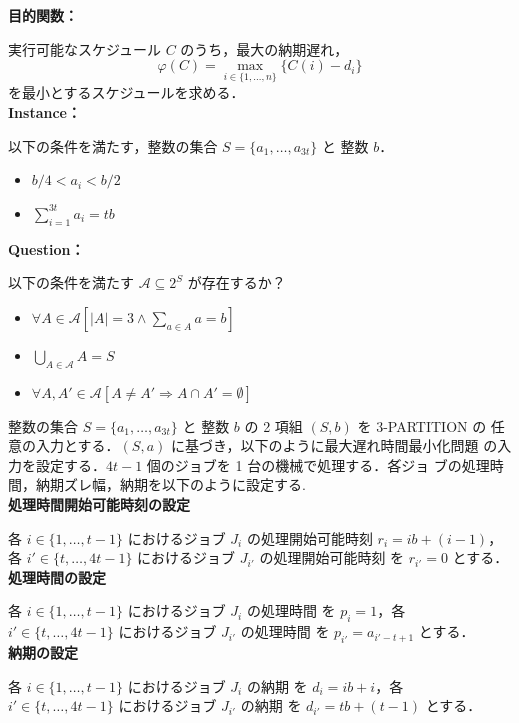 \documentclass[12pt]{optlab-bachelor}
\begin{document}
\noindent \textbf{目的関数：}

実行可能なスケジュール $C$ のうち，最大の納期遅れ，
$$\displaystyle \varphi(C) = \max_{i \in \{1,\ldots,n\}}\{C(i) - d_i\}$$
を最小とするスケジュールを求める．\\

\noindent \textbf{Instance：}

以下の条件を満たす，整数の集合 $S = \{a_1,\ldots,a_{3t}\}$ と 整数 $b$．
\begin{itemize}
\item $b/4 < a_i < b/2$
\item $\displaystyle \sum_{i = 1}^{3t}a_i = tb$
\end{itemize}

\noindent \textbf{Question：}

以下の条件を満たす $\mathcal{A} \subseteq 2^S$ が存在するか？
\begin{itemize}
\item $\forall A \in \mathcal{A}[|A| = 3 \land \sum_{a \in A} a = b]$
\item $\bigcup_{A \in \mathcal{A}} A = S$
\item $\forall A, A' \in \mathcal{A}[A \neq A' \Rightarrow A \cap A' = \emptyset]$
\end{itemize}

整数の集合 $S = \{a_1,\ldots,a_{3t}\}$ と 整数 $b$ の 2 項組 $(S,b)$ を 3-PARTITION の
任意の入力とする．$(S,a)$ に基づき，以下のように最大遅れ時間最小化問題
の入力を設定する．$4t - 1$ 個のジョブを 1 台の機械で処理する．各゙ジョ
ブの処理時間，納期ズレ幅，納期を以下のように設定する.\\

\noindent \textbf{処理時間開始可能時刻の設定}

各 $i \in \{1,\ldots,t - 1\}$ におけるジョブ $J_i$ の処理開始可能時刻
$r_i = ib + (i - 1)$，各 $i' \in \{t,\ldots,4t - 1\}$ におけるジョブ $J_{i'}$ の処理開始可能時刻
を $r_{i'} = 0$ とする．\\

\noindent \textbf{処理時間の設定}

各 $i \in \{1,\ldots,t - 1\}$ におけるジョブ $J_i$ の処理時間
を $p_i = 1$，各 $i' \in \{t,\ldots,4t - 1\}$ におけるジョブ $J_{i'}$ の処理時間
を $p_{i'} = a_{i' - t + 1}$ とする．\\

\noindent \textbf{納期の設定}

各 $i \in \{1,\ldots,t - 1\}$ におけるジョブ $J_i$ の納期
を $d_i = ib + i$，各 $i' \in \{t,\ldots,4t - 1\}$ におけるジョブ $J_{i'}$ の納期
を $d_{i'} = tb + (t - 1)$ とする．\\
\end{document}
